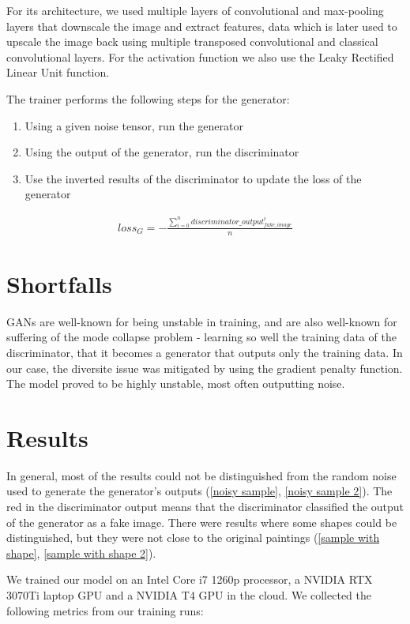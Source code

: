 \documentclass[conference]{IEEEtran}
\begin{document}
    For its architecture, we used multiple layers of convolutional and max-pooling layers that downscale the image and extract features,
data which is later used to upscale the image back using multiple transposed convolutional and classical convolutional layers.
For the activation function we also use the Leaky Rectified Linear Unit function.

    The trainer performs the following steps for the generator:
\begin{enumerate}
    \item Using a given noise tensor, run the generator
    \item Using the output of the generator, run the discriminator
    \item Use the inverted results of the discriminator to update the loss of the generator
\end{enumerate}

\begin{multline}
    loss_{G} = - \frac{\sum_{i=0}^{n} discriminator\_output_{fake\_image}^i}{n}
\end{multline}

\section{Shortfalls}
    GANs are well-known for being unstable in training, and are also well-known for suffering of the mode collapse problem -
learning so well the training data of the discriminator, that it becomes a generator that outputs only the training data. In
our case, the diversite issue was mitigated by using the gradient penalty function. The model proved to be highly unstable,
most often outputting noise.

\section{Results}
    In general, most of the results could not be distinguished from the random noise used to generate the generator's outputs
(\ref{noisy sample}, \ref{noisy sample 2}). The red in the discriminator output means that the discriminator classified the
output of the generator as a fake image. There were results where some shapes could be distinguished, but they were not close
to the original paintings (\ref{sample with shape}, \ref{sample with shape 2}).

    We trained our model on an Intel Core i7 1260p processor, a NVIDIA RTX 3070Ti laptop GPU and a NVIDIA T4 GPU in the cloud.
We collected the following metrics from our training runs:
\end{document}
